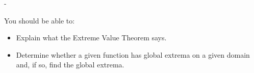 \documentclass{article}
\makeatletter
\newlength{\tipmargin}
\renewenvironment{framed}{
  \setlength{\tipmargin}{\textwidth-\linewidth}
  \advance\@totalleftmargin-\tipmargin
  \def\FrameCommand{\hspace{\tipmargin}\fbox}%
  \advance\linewidth\tipmargin
  \MakeFramed {\advance\hsize-\width \FrameRestore}%
}
{\endMakeFramed}
\makeatother
\begin{document}

\begin{problemonly}
  \begin{framed}

You should be able to:
    \begin{itemize}[topsep=0pt,partopsep=0pt,parsep=8pt,itemsep=0pt]
    \item Explain what the Extreme Value Theorem says.

    \item Determine whether a given function has global extrema on a given domain and, if so, find the global extrema.

    \end{itemize}
  \end{framed}
\end{problemonly}
\end{document}
